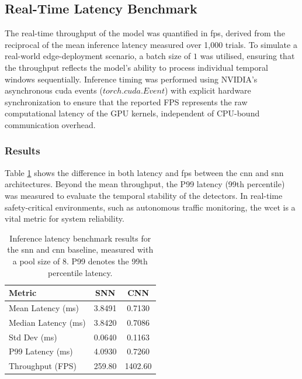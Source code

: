 \subsection{Real-Time Latency Benchmark}
\label{subsec:exp_latency}

The real-time throughput of the model was quantified in \gls{fps}, derived from the reciprocal of the mean inference latency measured over 1,000 trials. 
To simulate a real-world edge-deployment scenario, a batch size of $1$ was utilised, ensuring that the throughput
reflects the model's ability to process individual temporal windows
sequentially. 
Inference timing was performed using NVIDIA's asynchronous \gls{cuda}
events ($torch.cuda.Event$) with explicit hardware synchronization to
ensure that the reported FPS represents the raw computational latency of
the GPU kernels, independent of CPU-bound communication overhead.

\subsubsection*{Results}

Table \ref{tab:latency_benchmark} shows the difference in both latency and \gls{fps} between the \gls{cnn} and \gls{snn} architectures.
Beyond the mean throughput, the P99 latency (99th percentile) was
measured to evaluate the temporal stability of the detectors. In real-time
safety-critical environments, such as autonomous traffic monitoring, the
\gls{wcet} is a vital metric for system reliability.

\begin{table}[h]
\centering
\begin{tabular}{|l|c|c|}
\hline
\textbf{Metric} & \textbf{SNN} & \textbf{CNN} \\
\hline
Mean Latency (ms)   & 3.8491 & 0.7130 \\
Median Latency (ms) & 3.8420 & 0.7086 \\
Std Dev (ms)        & 0.0640 & 0.1163 \\
P99 Latency (ms)    & 4.0930 & 0.7260 \\
Throughput (FPS)    & 259.80 & 1402.60 \\
\hline
\end{tabular}
\caption[Inference Latency Benchmark]{Inference latency benchmark results for the \gls{snn} and \gls{cnn} baseline, measured with a pool size of 8. P99 denotes the 99th percentile latency.}
\label{tab:latency_benchmark}
\end{table}

